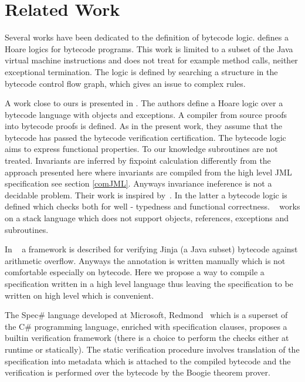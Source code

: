 \section{Related Work} \label{relWork}
    

Several works have been dedicated to the definition of bytecode logic.
 \cite{Quigley} defines a Hoare logics for bytecode programs. This work is limited to a subset of the Java virtual machine instructions and does not treat for example method calls, neither exceptional termination. The logic is defined by searching a structure in the bytecode control flow graph, which gives an issue to complex rules.

A work close to ours is presented in \cite{BM05plb}. The authors define a Hoare logic over a bytecode language with objects and  exceptions. A compiler from source proofs into bytecode proofs is defined. As in the present work, they assume that the bytecode has passed the bytecode verification certification. The bytecode logic aims to express functional properties. To our knowledge subroutines are not treated. Invariants are inferred by fixpoint calculation differently from the approach presented here where invariants are compiled from the high level JML specification see section \ref{comJML}. Anyways invariance ineference is not a decidable problem. Their work is inspired by~\cite{B04tlsj}. In the latter a bytecode logic is defined which checks both for well - typedness and functional correctness. ~\cite{B04tlsj} works on a stack language which does not support objects, references, exceptions and subroutines. 

In ~\cite{WildmoserN-ESOP05} a  framework is described for verifying Jinja (a Java subset) bytecode against arithmetic overflow. Anyways the annotation is written manually which is not comfortable especially on bytecode. Here we propose a way to compile a specification written in a high level language thus leaving the specification to be written on high level which is convenient.%

The Spec\# language  developed at Microsoft, Redmond~\cite{BLS04sp} which is a superset of the C\# programming language, enriched with specification clauses,
 proposes a builtin verification framework (there is a choice to perform the checks either at runtime or statically). The static verification procedure  involves translation of the specification into metadata which is attached to the compiled bytecode and the verification is performed over the bytecode by the Boogie theorem prover.  
 
